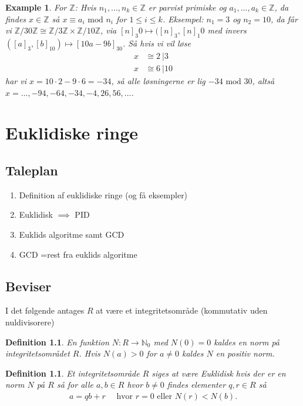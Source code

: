 \documentclass[10pt,twoside,openany,final]{memoir}
\theoremstyle{break}
\newtheorem{definition}[section]{Definition}
\theoremstyle{Break}
\newtheorem{example}[section]{Example}
\newcommand{\N}{\mathbb{N}}
\newcommand{\Z}{\mathbb{Z}}
\begin{document}
\begin{example}
For $\Z$: Hvis $n_1,\dots,n_k \in \Z$ er parvist primiske og $a_1,\dots,a_k \in \Z$, da findes $x \in \Z$ så $x \equiv a_i \textrm{ mod } n_i$ for $1 \leq i \leq k$. Eksempel: $n_1=3$ og $n_2=10$, da får vi $\Z/30\Z \cong \Z/3\Z \times \Z/10\Z$, via $[n]_3{0} \mapsto ([n]_3,[n]_1{0}$ med invers $([a]_3,[b]_{10})\mapsto [10a-9b]_{30}$. Så hvis vi vil løse
\begin{align*}
x &\cong 2 \ | 3\\
x &\cong 6 \ | 10
\end{align*}
har vi $x=10 \cdot 2 - 9 \cdot 6=-34$, så alle løsningerne er lig $-34 \textrm{ mod } 30$, altså $x=\dots,-94,-64,-34,-4,26,56,\dots$.
\end{example}

\chapter{Euklidiske ringe}
\section*{Taleplan}
\begin{enumerate}
\item Definition af euklidiske ringe (og få eksempler)
\item Euklidisk $\implies$ PID
\item Euklids algoritme samt GCD
\item GCD =rest fra euklids algoritme
\end{enumerate}
\section*{Beviser}
I det følgende antages $R$ at være et integritetsområde (kommutativ uden nuldivisorere)
\begin{definition}
En funktion $N  \colon R \to \N_0$ med $N(0)=0$ kaldes en \emph{norm} på integritetsområdet $R$. Hvis $N(a) >0$ for $a \neq 0$ kaldes $N$ en positiv norm.
\end{definition}

\begin{definition}
Et integritetsområde $R$ siges at være \emph{Euklidisk} hvis der er en norm $N$ på $R$ så for alle $a,b \in R$ hvor $b \neq 0$ findes elementer $q,r \in R$ så
\begin{align*}
a=qb+r \quad \text{ hvor } r=0 \text{ eller } N(r) < N(b).
\end{align*}
\end{definition}
\end{document}
